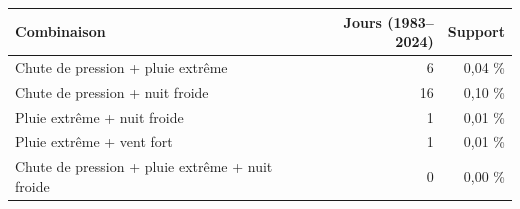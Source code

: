 \small
\begin{tabular}{lrr}
\toprule
\rowcolor{NuitBleue!90}
\color{white}\textbf{Combinaison} & \color{white}\textbf{Jours (1983--2024)} & \color{white}\textbf{Support} \\
\midrule
Chute de pression + pluie extrême & 6 & 0,04 \% \\
Chute de pression + nuit froide & 16 & 0,10 \% \\
Pluie extrême + nuit froide & 1 & 0,01 \% \\
Pluie extrême + vent fort & 1 & 0,01 \% \\
Chute de pression + pluie extrême + nuit froide & 0 & 0,00 \% \\
\bottomrule
\end{tabular}
